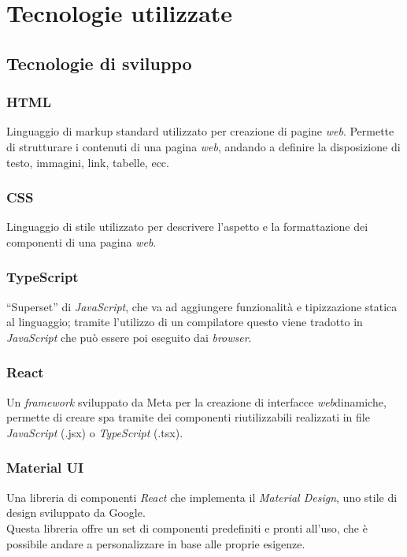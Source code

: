 \pagebreak
\section{Tecnologie utilizzate}
\label{sez:tecnologie-utilizzate}

\subsection{Tecnologie di sviluppo}
\label{sez:tecnologie-sviluppo}

\subsubsection{HTML}

Linguaggio di markup standard utilizzato per creazione di pagine \textit{web}.
Permette di strutturare i contenuti di una pagina \textit{web}, andando a definire la disposizione di testo, immagini, link, tabelle, ecc.

\subsubsection{CSS}
Linguaggio di stile utilizzato per descrivere l’aspetto e la formattazione dei componenti di una pagina \textit{web}.

\subsubsection{TypeScript}

“Superset” di \textit{JavaScript}, che va ad aggiungere funzionalità e tipizzazione statica al linguaggio; 
tramite l’utilizzo di un compilatore questo viene tradotto in \textit{JavaScript} che può essere poi eseguito dai \textit{browser}.

\subsubsection{React}
Un \textit{framework} sviluppato da Meta per la creazione di interfacce \textit{web}dinamiche, permette di creare \gls{spa} tramite dei componenti riutilizzabili realizzati in file \textit{JavaScript} (.jsx) o \textit{TypeScript} (.tsx).

\subsubsection{Material UI}

Una libreria di componenti \textit{React} che implementa il \textit{Material Design}, uno stile di design sviluppato da Google.\\
Questa libreria offre un set di componenti predefiniti e pronti all’uso, che è possibile andare a personalizzare in base alle proprie esigenze.

